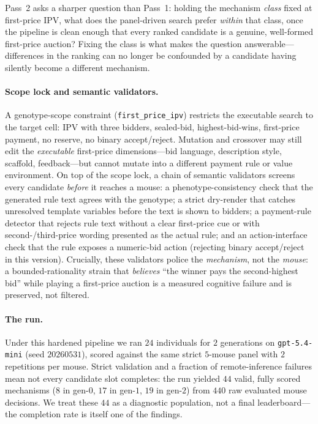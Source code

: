 \documentclass[12pt]{article}
\begin{document}
Pass~2 asks a sharper question than Pass~1: holding the mechanism \emph{class} fixed
at first-price IPV, what does the panel-driven search prefer \emph{within} that
class, once the pipeline is clean enough that every ranked candidate is a genuine,
well-formed first-price auction? Fixing the class is what makes the question
answerable---differences in the ranking can no longer be confounded by a candidate
having silently become a different mechanism.

\paragraph{Scope lock and semantic validators.} A genotype-scope constraint
(\texttt{first\_price\_ipv}) restricts the executable search to the target cell:
IPV with three bidders, sealed-bid, highest-bid-wins, first-price payment, no
reserve, no binary accept/reject. Mutation and crossover may still edit the
\emph{executable} first-price dimensions---bid language, description style, scaffold,
feedback---but cannot mutate into a different payment rule or value environment. On
top of the scope lock, a chain of semantic validators screens every candidate
\emph{before} it reaches a mouse: a phenotype-consistency check that the generated
rule text agrees with the genotype; a strict dry-render that catches unresolved
template variables before the text is shown to bidders; a payment-rule detector that
rejects rule text without a clear first-price cue or with second-/third-price
wording presented as the actual rule; and an action-interface check that the rule
exposes a numeric-bid action (rejecting binary accept/reject in this version).
Crucially, these validators police the \emph{mechanism}, not the \emph{mouse}: a
bounded-rationality strain that \emph{believes} ``the winner pays the second-highest
bid'' while playing a first-price auction is a measured cognitive failure and is
preserved, not filtered.

\paragraph{The run.} Under this hardened pipeline we ran $24$ individuals for $2$
generations on \texttt{gpt-5.4-mini} (seed $20260531$), scored against the same
strict $5$-mouse panel with $2$ repetitions per mouse. Strict validation and a
fraction of remote-inference failures mean not every candidate slot completes: the
run yielded $44$ valid, fully scored mechanisms ($8$ in gen-$0$, $17$ in gen-$1$,
$19$ in gen-$2$) from $440$ raw evaluated mouse decisions. We treat these $44$ as a
diagnostic population, not a final leaderboard---the completion rate is itself one of
the findings.
\end{document}

